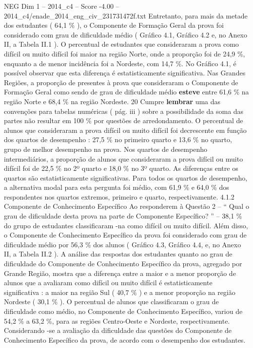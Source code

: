 \begin{textsample}{NEG Dim 1 – 2014\_c4 – Score -4.00 – 2014\_c4/enade\_2014\_eng\_civ\_231731472f.txt}
Entretanto, para mais da metade dos estudantes ( 64,1 \% ), o Componente de Formação Geral da prova foi considerado com grau de dificuldade médio ( Gráfico 4.1, Gráfico 4.2 e, no Anexo II, a Tabela II.1 ).
O percentual de estudantes que consideraram a prova como difícil ou muito difícil foi maior na região Norte, onde a proporção foi de 24,9 \%, enquanto a de menor incidência foi a Nordeste, com 14,7 \%.
No Gráfico 4.1, é possível observar que esta diferença é estatisticamente significativa.
Nas Grandes Regiões, a proporção de presentes à prova que consideraram o Componente de Formação Geral como sendo de grau de dificuldade médio \textbf{esteve} entre 61,6 \% na região Norte e 68,4 \% na região Nordeste. 20 Cumpre \textbf{lembrar} uma das convenções para tabelas numéricas ( pág. iii ) sobre a possibilidade da soma das partes não resultar em 100 \% por questões de arredondamento.
O percentual de alunos que consideraram a prova difícil ou muito difícil foi decrescente em função dos quartos de desempenho : 27,5 \% no primeiro quarto e 13,6 \% no quarto, grupo de melhor desempenho na prova.
Nos quartos de desempenho intermediários, a proporção de alunos que consideraram a prova difícil ou muito difícil foi de 22,5 \% no 2º quarto e 18,0 \% no 3º quarto.
As diferenças entre os quartos são estatisticamente significativas.
Para todos os quartos de desempenho, a alternativa modal para esta pergunta foi médio, com 61,9 \% e 64,0 \% dos respondentes nos quartos extremos, primeiro e quarto, respectivamente. 4.1.2 Componente de Conhecimento Específico Ao responderem à Questão 2 – “ Qual o grau de dificuldade desta prova na parte de Componente Específico? ” – 38,1 \% do grupo de estudantes classificaram -na como difícil ou muito difícil.
Além disso, o Componente de Conhecimento Específico da prova foi considerado com grau de dificuldade médio por 56,3 \% dos alunos ( Gráfico 4.3, Gráfico 4.4, e, no Anexo II, a Tabela II.2 ).
A análise das respostas dos estudantes quanto ao grau de dificuldade do Componente de Conhecimento Específico da prova, agregado por Grande Região, mostra que a diferença entre a maior e a menor proporção de alunos que a avaliaram como difícil ou muito difícil é estatisticamente significativa : a maior na região Sul ( 40,7 \% ) e a menor proporção na região Nordeste ( 30,1 \% ).
O percentual de alunos que classificaram o grau de dificuldade como médio, no Componente de Conhecimento Específico, variou de 54,2 \% a 63,2 \%, para as regiões Centro-Oeste e Nordeste, respectivamente.
Considerando -se a avaliação da dificuldade das questões do Componente de Conhecimento Específico da prova, de acordo com o desempenho dos estudantes.

\end{textsample}
